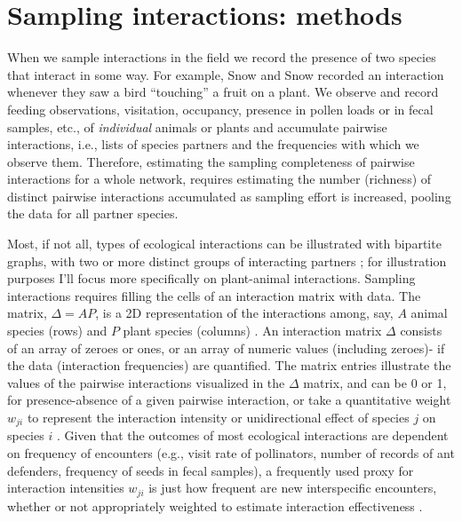 \documentclass[12pt]{article}
\begin{document}
\section*{Sampling interactions: methods}
\label{samplinginteractions:methods}
When we sample interactions in the field we record the presence of two species that interact in some way. For example, Snow and Snow\citeyearpar{Snow:1988iu} recorded an interaction whenever they saw a bird ``touching'' a fruit on a plant. We observe and record feeding observations, visitation, occupancy, presence in pollen loads or in fecal samples, etc., of \emph{individual} animals or plants and accumulate pairwise interactions, i.e., lists of species partners and the frequencies with which we observe them. Therefore, estimating the sampling completeness of pairwise interactions for a whole network, requires estimating the number (richness) of distinct pairwise interactions accumulated as sampling effort is increased, pooling the data for all partner species. 

Most, if not all, types of ecological interactions can be illustrated with bipartite graphs, with two or more distinct groups of interacting partners \citep{Bascompte:2014to}; for illustration purposes I'll focus more specifically on plant-animal interactions. Sampling interactions requires filling the cells of an interaction matrix with data. The matrix, $\Delta= AP$, is a 2D representation of the interactions among, say, $A$ animal species (rows) and $P$ plant species (columns) \citep{E31/2562,Bascompte:2014to}. An interaction matrix $\Delta$ consists of an array of zeroes or ones, or an array of numeric values (including zeroes)- if the data (interaction frequencies) are quantified. The matrix entries illustrate the values of the pairwise interactions visualized in the $\Delta$ matrix, and can be 0 or 1, for presence-absence of a given pairwise interaction, or take a quantitative weight $w_{ji}$ to represent the interaction intensity or unidirectional effect of species $j$ on species $i$ \citep{Bascompte:2014to,Vazquez:2015ec}. Given that the outcomes of most ecological interactions are dependent on frequency of encounters (e.g., visit rate of pollinators, number of records of ant defenders, frequency of seeds in fecal samples), a frequently used proxy for interaction intensities $w_{ji}$ is just how frequent are new interspecific encounters, whether or not appropriately weighted to estimate interaction effectiveness \citep{Vazquez:2005}. 
\end{document}
